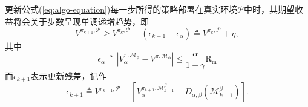 \begin{theorem}
更新公式(\ref{eq:algo-equation})每一步所得的策略部署在真实环境$\mathcal{P}$中时，其期望收益将会关于步数呈现单调递增趋势，即
\begin{equation}
    {V}^{\pi_{k+1}, \mathcal{P}}\geq {V}^{\pi_{k}, \mathcal{P}} + (\epsilon_{k+1} - \epsilon_\alpha) \triangleq {V}^{\pi_{k}, \mathcal{P}} + \eta,
\end{equation}
其中
\begin{equation}
    \epsilon_\alpha \triangleq |{V}_\alpha^{\pi, \mathcal{M}_{\phi}} - {V}^{\pi,\mathcal{M}_{\phi}}|   \leq \frac{\alpha}{1-\gamma}\mathrm{R_{m}}
\label{eq:eps-beta}
\end{equation}
而$\epsilon_{k+1}$表示更新残差，记作
\begin{equation}
    \epsilon_{k+1} \triangleq {V}^{\pi_{k+1}, \mathcal{P}} - \left[{V}_{\alpha}^{\pi_{k+1}, \mathcal{M}_{k+1}^\beta} - D_{\alpha,\beta}(\mathcal{M}_{k+1}^\beta)\right].
\end{equation}
\label{prop:performance}
\end{theorem}

